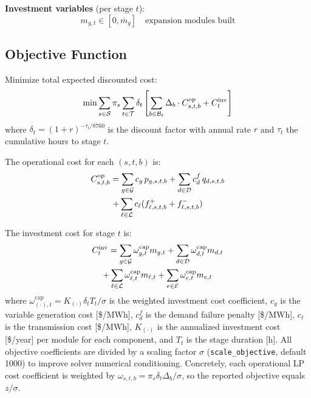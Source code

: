 \noindent\textbf{Investment variables} (per stage $t$):
\begin{equation}
  m_{g,t} \in [0, \overline{m}_g]
  \quad \text{expansion modules built} \label{eq:expmod}
\end{equation}

\subsection{Objective Function}

Minimize total expected discounted cost:
\begin{equation}
\label{eq:objective}
\min \sum_{s \in \mathcal{S}} \pi_s \sum_{t \in \mathcal{T}} \delta_t
\left[
  \sum_{b \in \mathcal{B}_t} \Delta_b \cdot C^\text{op}_{s,t,b}
  + C^\text{inv}_t
\right]
\end{equation}
where $\delta_t = (1+r)^{-\tau_t/8760}$ is the discount factor with annual
rate $r$ and $\tau_t$ the cumulative hours to stage $t$.

The operational cost for each $(s,t,b)$ is:
\begin{multline}
\label{eq:opcost}
C^\text{op}_{s,t,b} = \sum_{g \in \mathcal{G}} c_g \, p_{g,s,t,b}
  + \sum_{d \in \mathcal{D}} c^f_d \, q_{d,s,t,b} \\
  + \sum_{\ell \in \mathcal{L}} c_\ell
    (f^+_{\ell,s,t,b} + f^-_{\ell,s,t,b})
\end{multline}

The investment cost for stage $t$ is:
\begin{multline}
\label{eq:invcost}
C^\text{inv}_t = \sum_{g \in \mathcal{G}} \omega^\text{cap}_{g,t} m_{g,t}
  + \sum_{d \in \mathcal{D}} \omega^\text{cap}_{d,t} m_{d,t} \\
  + \sum_{\ell \in \mathcal{L}} \omega^\text{cap}_{\ell,t} m_{\ell,t}
  + \sum_{e \in \mathcal{E}} \omega^\text{cap}_{e,t} m_{e,t}
\end{multline}
where $\omega^\text{cap}_{(\cdot),t} = K_{(\cdot)} \delta_t T_t /
\sigma$ is the weighted investment cost coefficient,
$c_g$ is the variable generation cost [\$/MWh], $c^f_d$ is the
demand failure penalty [\$/MWh], $c_\ell$ is the transmission cost
[\$/MWh], $K_{(\cdot)}$ is the annualized investment cost
[\$/year] per module for each component, and $T_t$ is the stage
duration [h].  All objective coefficients are divided by a
scaling factor $\sigma$ (\texttt{scale\_objective}, default 1000) to
improve solver numerical conditioning.  Concretely, each operational LP
cost coefficient is weighted by $\omega_{s,t,b} = \pi_s \delta_t
\Delta_b / \sigma$, so the reported objective equals $z/\sigma$.

